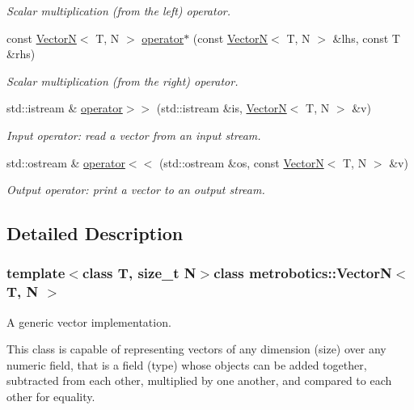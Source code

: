 \begin{DoxyCompactItemize}
\begin{DoxyCompactList}\small\item\em \-Scalar multiplication (from the left) operator. \end{DoxyCompactList}\item 
const \hyperlink{classmetrobotics_1_1VectorN}{\-Vector\-N}$<$ \-T, \-N $>$ \hyperlink{classmetrobotics_1_1VectorN_a3c40c71754a26c7c4b64c9ca6a29c553}{operator$\ast$} (const \hyperlink{classmetrobotics_1_1VectorN}{\-Vector\-N}$<$ \-T, \-N $>$ \&lhs, const \-T \&rhs)
\begin{DoxyCompactList}\small\item\em \-Scalar multiplication (from the right) operator. \end{DoxyCompactList}\item 
std\-::istream \& \hyperlink{classmetrobotics_1_1VectorN_abc46aee3d00f2a46c7f3ae4a7af55e27}{operator$>$$>$} (std\-::istream \&is, \hyperlink{classmetrobotics_1_1VectorN}{\-Vector\-N}$<$ \-T, \-N $>$ \&v)
\begin{DoxyCompactList}\small\item\em \-Input operator\-: read a vector from an input stream. \end{DoxyCompactList}\item 
std\-::ostream \& \hyperlink{classmetrobotics_1_1VectorN_a90a12d5bf89371c1ec7502b00c59c466}{operator$<$$<$} (std\-::ostream \&os, const \hyperlink{classmetrobotics_1_1VectorN}{\-Vector\-N}$<$ \-T, \-N $>$ \&v)
\begin{DoxyCompactList}\small\item\em \-Output operator\-: print a vector to an output stream. \end{DoxyCompactList}\end{DoxyCompactItemize}


\subsection{\-Detailed \-Description}
\subsubsection*{template$<$class \-T, size\-\_\-t \-N$>$class metrobotics\-::\-Vector\-N$<$ T, N $>$}

\-A generic vector implementation. 

\-This class is capable of representing vectors of any dimension (size) over any numeric field, that is a field (type) whose objects can be added together, subtracted from each other, multiplied by one another, and compared to each other for equality.

